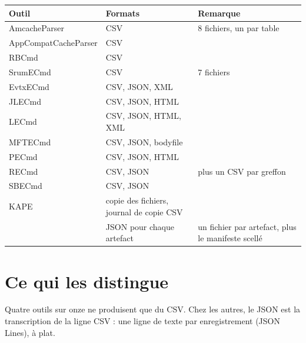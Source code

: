 \documentclass[11pt,a4paper,oneside]{report}
\begin{document}
\begin{longtable}{@{}L{4.4cm}L{5.4cm}L{5.2cm}@{}}
\toprule
\textbf{Outil} & \textbf{Formats} & \textbf{Remarque} \\
\midrule\endhead
AmcacheParser & CSV & 8 fichiers, un par table \\
AppCompatCacheParser & CSV & \\
RBCmd & CSV & \\
SrumECmd & CSV & 7 fichiers \\
EvtxECmd & CSV, JSON, XML & \\
JLECmd & CSV, JSON, HTML & \\
LECmd & CSV, JSON, HTML, XML & \\
MFTECmd & CSV, JSON, bodyfile & \\
PECmd & CSV, JSON, HTML & \\
RECmd & CSV, JSON & plus un CSV par greffon \\
SBECmd & CSV, JSON & \\
KAPE & copie des fichiers, journal de copie CSV & \\
\wac{} & JSON pour chaque artefact & un fichier par artefact, plus le manifeste scellé \\
\bottomrule
\end{longtable}

\section{Ce qui les distingue}

Quatre outils sur onze ne produisent que du CSV. Chez les autres, le JSON est la
transcription de la ligne CSV : une ligne de texte par enregistrement (JSON
Lines), à plat.
\end{document}
